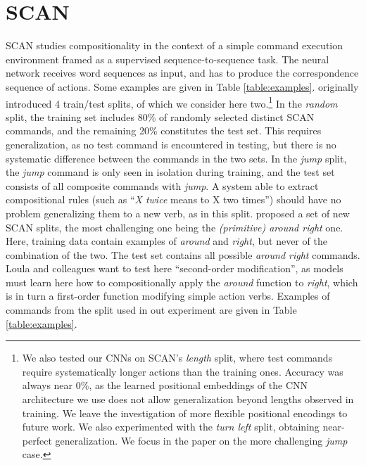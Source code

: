 \section{SCAN}
\label{sec:setup}

SCAN studies compositionality in the context of a simple command
execution environment framed as a supervised sequence-to-sequence
task. The neural network receives word sequences as input, and has to
produce the correspondence sequence of actions. Some examples are
given in Table \ref{table:examples}.
   originally introduced 4
train/test splits, of which we consider here two.\footnote{We also
  tested our CNNs on SCAN's \emph{length} split, where test commands
  require systematically longer actions than the training
  ones. Accuracy was always near 0\%, as the learned positional
  embeddings of the CNN architecture we use does not allow
  generalization beyond lengths observed in training. We leave the
  investigation of more flexible positional encodings \cite[as in,
  e.g.,][]{vaswani:etal:2017} to future work. We also experimented
  with the \emph{turn left} split, obtaining near-perfect
  generalization. We focus in the paper on the more challenging
  \emph{jump} case.} In the \emph{random} split, the training set
includes 80\% of randomly selected distinct SCAN commands, and the
remaining 20\% constitutes the test set. This requires generalization,
as no test command is encountered in testing, but there is no
systematic difference between the commands in the two sets.  In the
\emph{jump} split, the \emph{jump} command is only seen in isolation
during training, and the test set consists of all composite commands
with \emph{jump}. A system able to extract compositional rules (such
as ``\emph{X twice} means to X two times'') should have no problem
generalizing them to a new verb, as in this
split.  proposed a set of new SCAN splits,
the most challenging one being the \emph{(primitive) around right}
one.  Here, training data contain examples of \emph{around} and
\emph{right}, but never of the combination of the two. The test set
contains all possible \emph{around right} commands. Loula and
colleagues want to test here ``second-order modification'', as models
must learn here how to compositionally apply the \emph{around}
function to \emph{right}, which is in turn a first-order function
modifying simple action verbs. Examples of commands from the split
used in out experiment are given in Table \ref{table:examples}.

